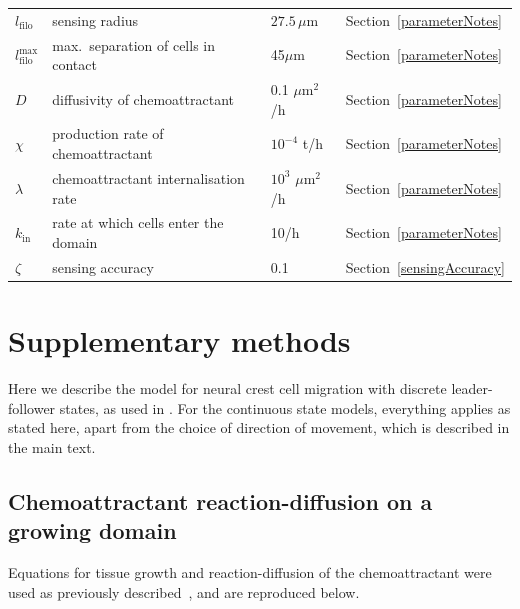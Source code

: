 \documentclass[review]{elsarticle}
\begin{document}
\begin{table}[htbp]
\begin{tabular}{llll}
                $l_\mathrm{filo}$ & sensing radius & $27.5\,\mu$m & Section~\ref{parameterNotes} \\
                
                $l^\mathrm{max}_\mathrm{filo}$ & max.\ separation of cells in contact & 45$\mu$m & Section~\ref{parameterNotes} \\
                            
                $D$ & diffusivity of chemoattractant & 0.1 $\mu$m$^2$/h & Section~\ref{parameterNotes}\\
                
                $\chi$ & production rate of chemoattractant & $10^{-4}$ t/h  & Section~\ref{parameterNotes}\\
                
                $\lambda$ & chemoattractant internalisation rate & $10^3$ $\mu$m$^2$/h & Section~\ref{parameterNotes}\\
                
                $k_\mathrm{in}$ & rate at which cells enter the domain & 10/h & Section~\ref{parameterNotes}\\
                
                $\zeta$ & sensing accuracy & 0.1 &  Section~\ref{sensingAccuracy}
                
    		\end{tabular}
    	\end{table}

\clearpage

    \section{Supplementary methods}
    Here we describe the model for neural crest cell migration with discrete leader-follower states, as used in \cite{McLennan2015,McLennan2015b,McLennan2017}. For the continuous state models, everything applies as stated here, apart from the choice of direction of movement, which is described in the main text.
    
    	\subsection{Chemoattractant reaction-diffusion on a growing domain}
        Equations for tissue growth and reaction-diffusion of the chemoattractant were used as previously described~\cite[][Supplementary Information]{McLennan2015,McLennan2015b,McLennan2017}, and are reproduced below.
        
\end{document}

